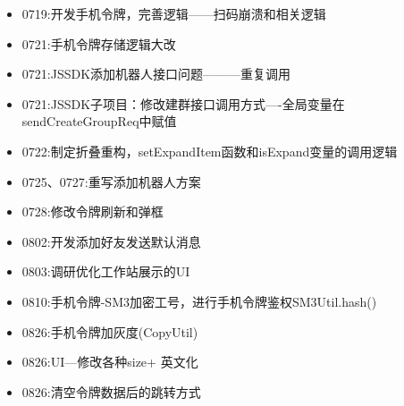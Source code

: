 \documentclass{ctexart}
\begin{document}
\begin{itemize}
		\item 0719:开发手机令牌，完善逻辑——扫码崩溃和相关逻辑
		\item 0721:手机令牌存储逻辑大改
		\item 0721:JSSDK添加机器人接口问题———重复调用
		\item 0721:JSSDK子项目：修改建群接口调用方式—-全局变量在sendCreateGroupReq中赋值
		\item 0722:制定折叠重构，setExpandItem函数和isExpand变量的调用逻辑
		\item 0725、0727:重写添加机器人方案
		\item 0728:修改令牌刷新和弹框
		\item 0802:开发添加好友发送默认消息
		\item 0803:调研优化工作站展示的UI
		\item 0810:手机令牌-SM3加密工号，进行手机令牌鉴权SM3Util.hash()
		\item 0826:手机令牌加灰度(CopyUtil)
		\item 0826:UI—修改各种size+ 英文化
		\item 0826:清空令牌数据后的跳转方式
	\end{itemize}
	
	\newpage
\end{document}
